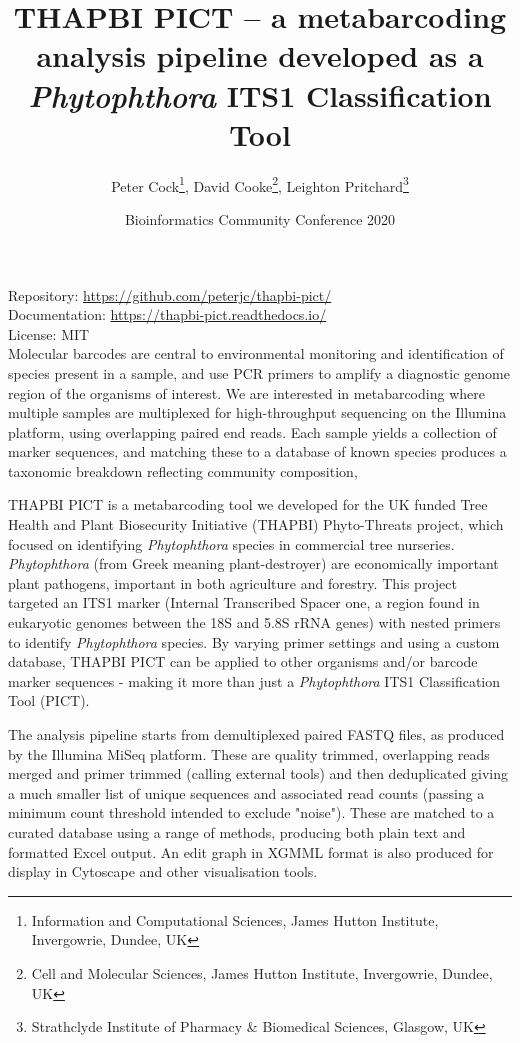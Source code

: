 \documentclass[10pt,oneside]{article}
\title{THAPBI PICT -- a metabarcoding analysis pipeline developed as a \textit{Phytophthora} ITS1 Classification Tool}
\author{
  Peter Cock\thanks{Information and Computational Sciences, James Hutton Institute, Invergowrie, Dundee, UK},
  David Cooke\thanks{Cell and Molecular Sciences, James Hutton Institute, Invergowrie, Dundee, UK},
  Leighton Pritchard\thanks{Strathclyde Institute of Pharmacy \& Biomedical Sciences, Glasgow, UK}
}
\date{Bioinformatics Community Conference 2020}
\begin{document}
\maketitle
\thispagestyle{empty}

\vspace{-0.2in}
\noindent
Repository: \url{https://github.com/peterjc/thapbi-pict/} \\
Documentation: \url{https://thapbi-pict.readthedocs.io/} \\
License: MIT \\

Molecular barcodes are central to environmental monitoring and identification of species present in a sample, and use PCR primers to amplify a diagnostic genome region of the organisms of interest. We are interested in metabarcoding where multiple samples are multiplexed for high-throughput sequencing on the Illumina platform, using overlapping paired end reads. Each sample yields a collection of marker sequences, and matching these to a database of known species produces a taxonomic breakdown reflecting community composition,

THAPBI PICT is a metabarcoding tool we developed for the UK funded Tree Health and Plant Biosecurity Initiative (THAPBI) Phyto-Threats project, which focused on identifying \textit{Phytophthora} species in commercial tree nurseries. \textit{Phytophthora} (from Greek meaning plant-destroyer) are economically important plant pathogens, important in both agriculture and forestry. This project targeted an ITS1 marker (Internal Transcribed Spacer one, a region found in eukaryotic genomes between the 18S and 5.8S rRNA genes) with nested primers to identify \textit{Phytophthora} species. By varying primer settings and using a custom database, THAPBI PICT can be applied to other organisms and/or barcode marker sequences - making it more than just a \textit{Phytophthora} ITS1 Classification Tool (PICT).

The analysis pipeline starts from demultiplexed paired FASTQ files, as produced by the Illumina MiSeq platform. These are quality trimmed, overlapping reads merged and primer trimmed (calling external tools) and then deduplicated giving a much smaller list of unique sequences and associated read counts (passing a minimum count threshold intended to exclude "noise"). These are matched to a curated database using a range of methods, producing both plain text and formatted Excel output. An edit graph in XGMML format is also produced for display in Cytoscape and other visualisation tools.
\end{document}
